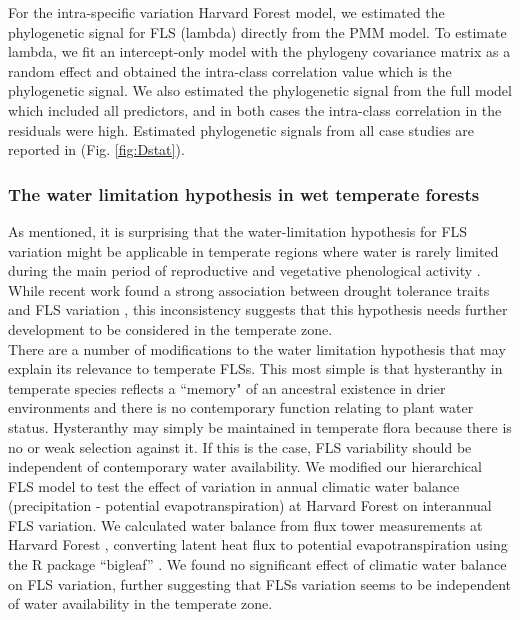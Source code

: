 \documentclass[11pt]{article}
\begin{document}
{  \noindent For the intra-specific variation Harvard Forest model, we estimated the phylogenetic signal for FLS (lambda) directly from the PMM model. To estimate lambda, we fit an intercept-only model with the phylogeny covariance matrix as a random effect and obtained the intra-class correlation value which is the phylogenetic signal. We also estimated the phylogenetic signal from the full model which included all predictors, and in both cases the intra-class correlation in the residuals were high. Estimated phylogenetic signals from all case studies are reported in (Fig. \ref{fig:Dstat}).  
  
  \subsubsection*{The water limitation hypothesis in wet temperate forests}
  \noindent As mentioned, it is surprising that the water-limitation hypothesis for FLS variation might be applicable in temperate regions where water is rarely limited during the main period of reproductive and vegetative phenological activity \citep{Polgar2011}. While recent work found a strong association between drought tolerance traits and FLS variation \citep{Gougherty2018}, this inconsistency suggests that this hypothesis needs further development to be considered in the temperate zone.\\
  
  \noindent There are a number of modifications to the water limitation hypothesis that may explain its relevance to temperate FLSs. This most simple is that hysteranthy in temperate species reflects a ``memory" of an ancestral existence in drier environments and there is no contemporary function relating to plant water status. Hysteranthy may simply be maintained in temperate flora because there is no or weak selection against it. If this is the case, FLS variability should be independent of contemporary water availability. We modified our hierarchical FLS model to test the effect of variation in annual climatic water balance (precipitation - potential evapotranspiration) at Harvard Forest on interannual FLS variation. We calculated water balance from flux tower measurements at Harvard Forest \citep{Hadley2004}, converting latent heat flux to potential evapotranspiration using the R package ``bigleaf'' \citep{Knauer2018}. We found no significant effect of climatic water balance on FLS variation, further suggesting that FLSs variation seems to be independent of water availability in the temperate zone.\\%
  
}
\end{document}
